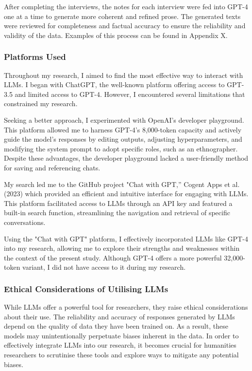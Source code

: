 \documentclass[
]{book}
\begin{document}
After completing the interviews, the notes for each interview were fed into GPT-4 one at a time to generate more coherent and refined prose. The generated texts were reviewed for completeness and factual accuracy to ensure the reliability and validity of the data. Examples of this process can be found in Appendix X.

\hypertarget{platforms-used}{%
\subsubsection{Platforms Used}\label{platforms-used}}

Throughout my research, I aimed to find the most effective way to interact with LLMs. I began with ChatGPT, the well-known platform offering access to GPT-3.5 and limited access to GPT-4. However, I encountered several limitations that constrained my research.

Seeking a better approach, I experimented with OpenAI's developer playground. This platform allowed me to harness GPT-4's 8,000-token capacity and actively guide the model's responses by editing outputs, adjusting hyperparameters, and modifying the system prompt to adopt specific roles, such as an ethnographer. Despite these advantages, the developer playground lacked a user-friendly method for saving and referencing chats.

My search led me to the GitHub project "Chat with GPT,'' Cogent Apps et al. (2023) which provided an efficient and intuitive interface for engaging with LLMs. This platform facilitated access to LLMs through an API key and featured a built-in search function, streamlining the navigation and retrieval of specific conversations.

Using the "Chat with GPT" platform, I effectively incorporated LLMs like GPT-4 into my research, allowing me to explore their strengths and weaknesses within the context of the present study. Although GPT-4 offers a more powerful 32,000-token variant, I did not have access to it during my research.

\hypertarget{ethical-considerations-of-utilising-llms}{%
\subsubsection{Ethical Considerations of Utilising LLMs}\label{ethical-considerations-of-utilising-llms}}

While LLMs offer a powerful tool for researchers, they raise ethical considerations about their use. The reliability and accuracy of responses generated by LLMs depend on the quality of data they have been trained on. As a result, these models may unintentionally perpetuate biases inherent in the data. In order to effectively integrate LLMs into our research, it becomes crucial for humanities researchers to scrutinise these tools and explore ways to mitigate any potential biases.
\end{document}
